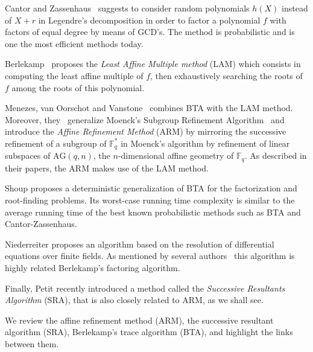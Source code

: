\documentclass{sig-alternate}
\newcommand{\qq}{q}
\newcommand{\nn}{n}
\newcommand{\AG}{\mathrm{AG}(\qq,\nn)}
\newcounter{algo}
\renewcommand{\paragraph}[1]{\smallskip\noindent{{\bf \rm #1.}}}
\begin{document}
Cantor and Zassenhaus~\cite{cantor1981} suggests to consider random polynomials $h(X)$ instead of $X+r$ in Legendre's decomposition in order to factor a polynomial $f$ with factors of equal degree by means of GCD's. The method is probabilistic and is one the most efficient methods today.

Berlekamp~\cite{mBER84a} proposes the \emph{Least Affine Multiple method} (LAM) which consists in computing the least affine multiple of $f$, then exhaustively searching the roots of $f$ among the roots of this polynomial. 

Menezes, van Oorschot and Vanstone~\cite{MenezesOV88,OorschotV89} combines BTA with the LAM method. Moreover, they~\cite{Menvanovans92} generalize Moenck's Subgroup Refinement Algorithm~\cite{Moenck77} and 
introduce the \emph{Affine Refinement Method} (ARM) by mirroring the successive refinement of a subgroup of $\mathbb{F}_{\qq}^\ast$ in Moenck's algorithm 
by refinement of linear subspaces of $\AG$, the $\nn$-dimensional affine geometry of $\mathbb{F}_{\qq}$. %
As described in their papers, the ARM makes use of the LAM method.

Shoup\cite{Shoup91b} proposes a deterministic generalization of BTA for the factorization and root-finding problems. Its worst-case running time complexity is similar to the average running time of the best known probabilistic methods such as BTA and Cantor-Zassenhaus.

Niederreiter\cite{nied94} proposes an algorithm based on the resolution of differential equations over finite fields.  As mentioned by several authors~\cite{Fleis96} this algorithm is highly related Berlekamp's factoring algorithm.


Finally, Petit\cite{cgUCL-P14} recently introduced a method called the \emph{Successive Resultants Algorithm} (SRA), that is also closely related to ARM, as we shall see.






\paragraph{Our contribution}
We review the affine refinement method (ARM), the successive resultant algorithm (SRA), Berlekamp's trace algorithm (BTA), and highlight the links between them.
\end{document}
